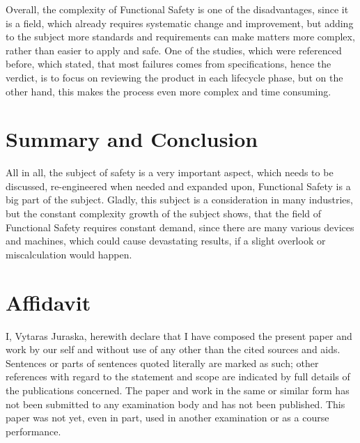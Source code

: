 \documentclass[conference]{IEEEtran}
\begin{document}
Overall, the complexity of Functional Safety is one of the disadvantages, since it is a field, which already requires systematic change and improvement, but adding to the subject more standards and requirements can make matters more complex, rather than easier to apply and safe. One of the studies, which were referenced before, which stated, that most failures comes from specifications, hence the verdict, is to focus on reviewing the product in each lifecycle phase, but on the other hand, this makes the process even more complex and time consuming.

\section{Summary and Conclusion}

All in all, the subject of safety is a very important aspect, which needs to be discussed, re-engineered when needed and expanded upon, Functional Safety is a big part of the subject. Gladly, this subject is a consideration in many industries, but the constant complexity growth of the subject shows, that the field of Functional Safety requires constant demand, since there are many various devices and machines, which could cause devastating results, if a slight overlook or miscalculation would happen.

\section{Affidavit}
I, Vytaras Juraska, herewith declare that I have composed the present paper and work by our self and without use of any other than the cited sources and aids. Sentences or parts of sentences quoted literally are marked as such; other references with regard to the statement and scope are indicated by full details of the publications concerned. The paper and work in the same or similar form has not been submitted to any examination body and has not been published. This paper was not yet, even in part, used in another examination or as a course performance.


\end{document}
